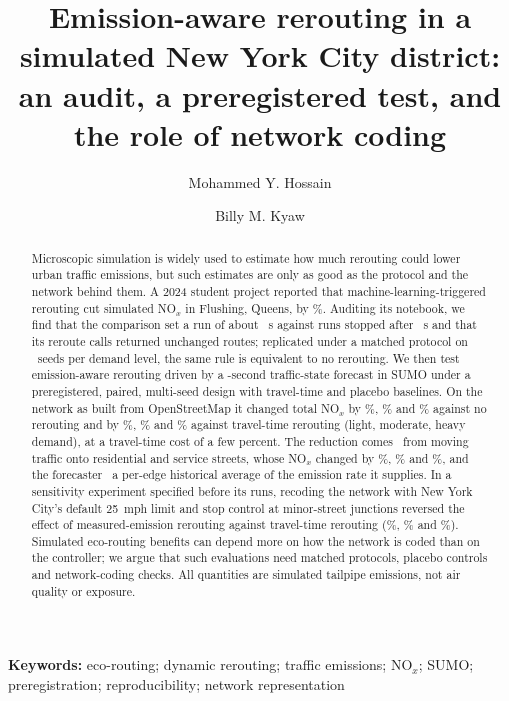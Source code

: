 \documentclass[11pt]{article}
\title{Emission-aware rerouting in a simulated New York City district:\\
an audit, a preregistered test, and the role of network coding}
\author{Mohammed Y. Hossain}
\author{Billy M. Kyaw}
\affil{New York Institute of Technology, New York, NY, USA}
\date{}
\begin{document}
\maketitle

\begin{abstract}
\noindent Microscopic simulation is widely used to estimate how much rerouting could lower urban traffic emissions,
but such estimates are only as good as the protocol and the network behind them. A 2024 student project reported
that machine-learning-triggered rerouting cut simulated NO$_x$ in Flushing, Queens, by \LegacyNOxDropRF\%. Auditing
its notebook, we find that the comparison set a run of about \LegacyBaselineHorizon~s against runs stopped after
\LegacyControlledSteps~s and that its reroute calls returned unchanged routes; replicated under a matched protocol
on \LegacyTestN\ seeds per demand level, the same rule is equivalent to no rerouting. We then test emission-aware
rerouting driven by a \HorizonS-second traffic-state forecast in SUMO under a preregistered, paired, multi-seed
design with travel-time and placebo baselines. On the network as built from OpenStreetMap it changed total NO$_x$
by \PCTwoLightMean\%, \PCTwoModerateMean\% and \PCTwoHeavyMean\% against no rerouting and by \PCThreeLightMean\%,
\PCThreeModerateMean\% and \PCThreeHeavyMean\% against travel-time rerouting (light, moderate, heavy demand), at a
travel-time cost of a few percent. The reduction comes \CompositionWord\ from moving traffic onto residential and
service streets, whose NO$_x$ changed by \ResidNOxLight\%, \ResidNOxModerate\% and \ResidNOxHeavy\%, and the forecaster
\ForecastVerdictR\ a per-edge historical average of the emission rate it supplies. In a sensitivity experiment
specified before its runs, recoding the network with New York City's default 25~mph limit and stop control at
minor-street junctions reversed the effect of measured-emission rerouting against travel-time rerouting
(\SensEcoReactiveVsTtAdaptiveTotalNoxGLightPosted\%, \SensEcoReactiveVsTtAdaptiveTotalNoxGModeratePosted\% and
\SensEcoReactiveVsTtAdaptiveTotalNoxGHeavyPosted\%). Simulated eco-routing benefits can depend more on how the network
is coded than on the controller; we argue that such evaluations need matched protocols, placebo controls and
network-coding checks. All quantities are simulated tailpipe emissions, not air quality or exposure.
\end{abstract}

\noindent\textbf{Keywords:} eco-routing; dynamic rerouting; traffic emissions; NO$_x$; SUMO; preregistration;
reproducibility; network representation
\end{document}
